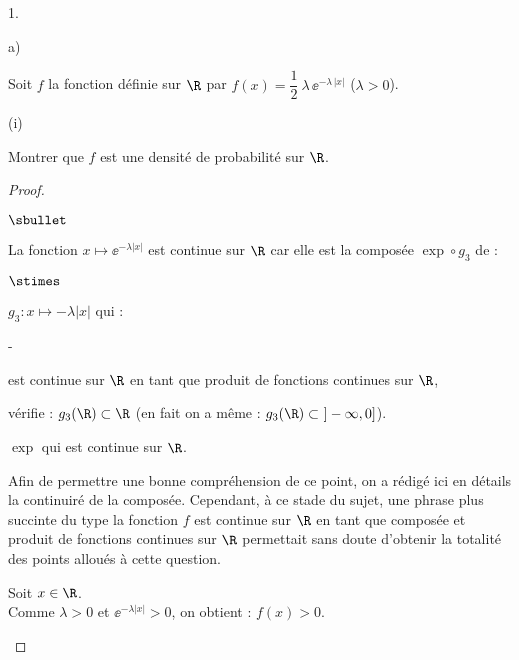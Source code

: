 \documentclass[11pt]{article}%
\begin{document}
\begin{noliste}{1.}
\begin{noliste}{a)}
  \item Soit $f$ la fonction définie sur $\R$ par $f(x) = \dfrac{1}{2}
    \ \lambda \, \ee^{-\lambda \, |x|}$ ($\lambda >0$).
    \begin{nonoliste}{(i)}
    \item Montrer que $f$ est une densité de probabilité sur $\R$.
    \end{nonoliste}
  \end{noliste}
  
  \begin{proof}~
    \begin{noliste}{$\sbullet$}
    \item La fonction $x \mapsto \ee^{-\lambda | x |}$ est continue
      sur $\R$ car elle est la composée $\exp \circ g_3$ de :
      \begin{noliste}{$\stimes$}
      \item $g_3 : x \mapsto -\lambda | x|$ qui :
        \begin{noliste}{-}
        \item est continue sur $\R$ en tant que produit de fonctions
          continues sur $\R$,
          
        \item vérifie : $g_3(\R) \subset \R$ (en fait on a même :
          $g_3(\R) \subset \ ]-\infty, 0]$).
        \end{noliste}
        
      \item $\exp$ qui est continue sur $\R$.
      \end{noliste}

      \begin{remarkL}{.95}
        Afin de permettre une bonne compréhension de ce point, on a
        rédigé ici en détails la continuiré de la
        composée. Cependant, à ce stade du sujet, une phrase plus
        succinte du type \og la
        fonction $f$ est continue sur $\R$ en tant que composée et
        produit de fonctions continues sur $\R$ \fg{} permettait sans
        doute d'obtenir la totalité des points alloués à cette
        question.
      \end{remarkL}
      
    \item Soit $x \in \R$.\\
      Comme $\lambda >0$ et $\ee^{-\lambda | x |} >0$, on obtient :
      $f(x) >0$.



\end{noliste}
\end{proof}
\end{noliste}
\end{document}
